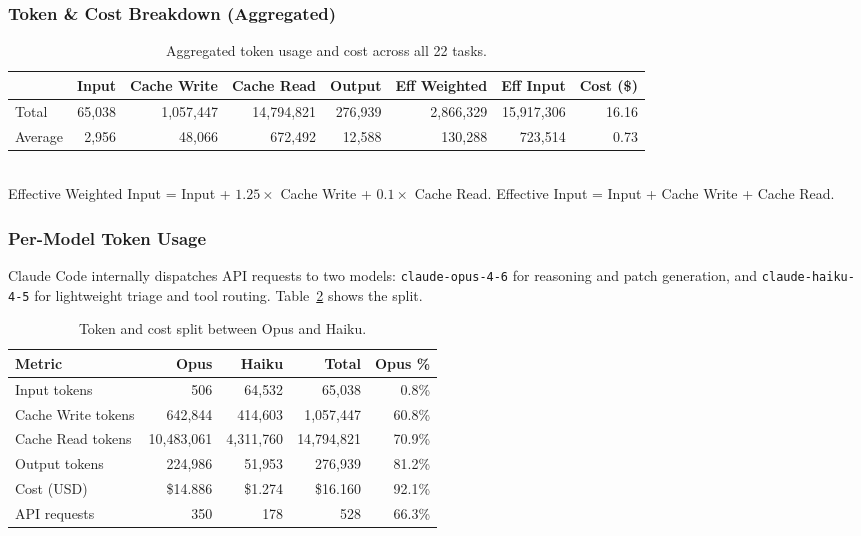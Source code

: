 \subsubsection{Token \& Cost Breakdown (Aggregated)}

\begin{table}[h]
\centering
\small
\caption{Aggregated token usage and cost across all 22 tasks.}\label{tab:tokens-agg-raw}
\setlength{\tabcolsep}{4pt}
\begin{tabular}{lrrrrrrr}
\toprule
& \textbf{Input} & \textbf{Cache Write} & \textbf{Cache Read} & \textbf{Output}
& \textbf{Eff Weighted} & \textbf{Eff Input} & \textbf{Cost (\$)} \\
\midrule
Total   & 65{,}038 & 1{,}057{,}447 & 14{,}794{,}821 & 276{,}939 & 2{,}866{,}329 & 15{,}917{,}306 & 16.16 \\
Average & 2{,}956  & 48{,}066      & 672{,}492       & 12{,}588  & 130{,}288     & 723{,}514      & 0.73  \\
\bottomrule
\end{tabular}
\\[4pt]
{\footnotesize
Effective Weighted Input = Input + $1.25 \times$ Cache Write + $0.1 \times$ Cache Read.\quad
Effective Input = Input + Cache Write + Cache Read.}
\end{table}

\subsubsection{Per-Model Token Usage}

Claude Code internally dispatches API requests to two models:
\texttt{claude-opus-4-6} for reasoning and patch generation, and
\texttt{claude-haiku-4-5} for lightweight triage and tool routing.
Table~\ref{tab:model-split-raw} shows the split.

\begin{table}[h]
\centering
\caption{Token and cost split between Opus and Haiku.}\label{tab:model-split-raw}
\begin{tabular}{lrrrr}
\toprule
\textbf{Metric} & \textbf{Opus} & \textbf{Haiku} & \textbf{Total} & \textbf{Opus \%} \\
\midrule
Input tokens       &          506 &     64{,}532 &      65{,}038 &   0.8\% \\
Cache Write tokens &    642{,}844 &    414{,}603 &   1{,}057{,}447 &  60.8\% \\
Cache Read tokens  & 10{,}483{,}061 & 4{,}311{,}760 & 14{,}794{,}821 &  70.9\% \\
Output tokens      &    224{,}986 &     51{,}953 &     276{,}939 &  81.2\% \\
Cost (USD)         &     \$14.886 &      \$1.274 &      \$16.160 &  92.1\% \\
API requests       &         350 &          178 &          528 &  66.3\% \\
\bottomrule
\end{tabular}
\end{table}

